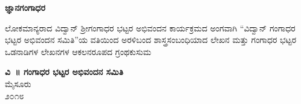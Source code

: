 {\fontsize{14}{16}\selectfont
\thispagestyle{empty}
\centerline{{\fontsize{40}{42}\bfseries ಜ್ಞಾನಗಂಗಾಧರ}}
\bigskip
\begin{center}
{\large ಲೋಕಮಾನ್ಯರಾದ ವಿದ್ವಾನ್ ಶ್ರೀಗಂಗಾಧರ ಭಟ್ಟರ ಅಭಿವಂದನ ಕಾರ್ಯಕ್ರಮದ
ಅಂಗವಾಗಿ “ವಿದ್ವಾನ್ ಗಂಗಾಧರ ಭಟ್ಟರ ಅಭಿವಂದನ ಸಮಿತಿ”ಯ
ವತಿಯಿಂದ ಅರಳಿಬಂದ ಶಾಸ್ತ್ರಸಂಬಂಧಿಯಾದ ಲೇಖನ
ಮತ್ತು ಗಂಗಾಧರ ಭಟ್ಟರ ಒಡನಾಡಿಗಳ ಲೇಖನಗಳ
ಆಕಲನರೂಪದ ಗ್ರಂಥಕುಸುಮ}
\end{center}
\vfill

\begin{center}
{\LARGE\bfseries ವಿ~॥ ಗಂಗಾಧರ ಭಟ್ಟರ ಅಭಿವಂದನ ಸಮಿತಿ}\\
\bigskip
{\large ಮೈಸೂರು\\
\smallskip
೨೦೧೮}
\end{center}
}
